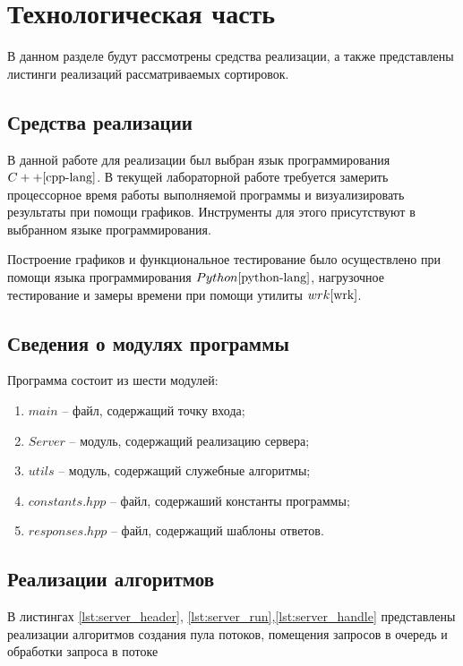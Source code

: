 \chapter{Технологическая часть}

В данном разделе будут рассмотрены средства реализации, а также представлены листинги реализаций рассматриваемых сортировок.

\section{Средства реализации}
В данной работе для реализации был выбран язык программирования $C++\cite{cpp-lang}$. В текущей лабораторной работе требуется замерить процессорное время работы выполняемой программы
и визуализировать результаты при помощи графиков. Инструменты для этого присутствуют в выбранном языке программирования.

Построение графиков и функциональное тестирование было осуществлено при помощи языка программирования $Python \cite{python-lang}$, нагрузочное тестирование и замеры времени при помощи утилиты $wrk \cite{wrk}$.

\section{Сведения о модулях программы}
Программа состоит из шести модулей:
\begin{enumerate}[label=\arabic*)]
	\item $main$ -- файл, содержащий точку входа;
	\item $Server$ -- модуль, содержащий реализацию сервера;
	\item $utils$ -- модуль, содержащий служебные алгоритмы;
	\item $constants.hpp$ -- файл, содержаший константы программы;
	\item $responses.hpp$ -- файл, содержащий шаблоны ответов. \newline
\end{enumerate}


\section{Реализации алгоритмов}

В листингах \ref{lst:server_header}, \ref{lst:server_run},\ref{lst:server_handle} представлены реализации алгоритмов создания пула потоков, помещения запросов в очередь и обработки запроса в потоке\clearpage

